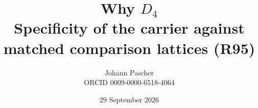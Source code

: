 \documentclass[11pt,a4paper]{report}
\title{Why $D_4$\\[0.5em]
  \large Specificity of the carrier against matched comparison lattices (R95)}
\date{29 September 2026}
\author{Johann Pascher\\\small ORCID 0009-0000-6518-4064}
\begin{document}
\renewcommand{\thechapter}{}
\renewcommand{\thesection}{\arabic{section}}
\maketitle
\tableofcontents

\end{document}
